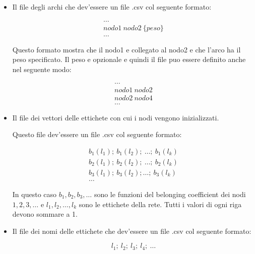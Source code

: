 \documentclass[a4paper,12pt]{report}
\begin{document}
			\begin{itemize}
				\item Il file degli archi che dev'essere un file .csv col seguente formato: 

				\begin{equation}
				\begin{aligned}
				\dots \\
				nodo1\ nodo2\ \{ peso \} \\
				\dots
				\end{aligned}
				\end{equation}

				Questo formato mostra che il nodo1 e collegato al nodo2 e che l'arco ha il peso specificato. Il peso e opzionale e quindi il file puo essere definito anche nel seguente modo: 

				\begin{equation}
				\begin{aligned}
				\dots \\
				nodo1\  nodo2 \\
				nodo2\  nodo4 \\
				\dots
				\end{aligned}
				\end{equation}				

				\item Il file dei vettori delle ettichete con cui i nodi vengono inizializzati. 

				Questo file dev'essere un file .csv col seguente formato: 

				\begin{equation}
				\begin{aligned}
				b_1(l_1);\ b_1(l_2);\ \dots;\ b_1(l_k) \\
				b_2(l_1);\ b_2(l_2);\ \dots;\ b_2(l_k) \\
				b_3(l_1);\ b_3(l_2); \dots;\ b_3(l_k) \\
				\dots
				\end{aligned}
				\end{equation}
				
				In questo caso $b_1, b_2, b_3, \dots$ sono le funzioni del belonging coefficient dei nodi $1, 2, 3, \dots$ e $l_1, l_2, \dots, l_k$ sono le ettichete della rete. Tutti i valori di ogni riga devono sommare a 1. 
				

				\item Il file dei nomi delle ettichete che dev'essere un file .csv col seguente formato: 

				\begin{equation}
				l_1;\ l_2;\ l_3;\ l_4;\ \dots
				\end{equation}


\end{itemize}
\end{document}
